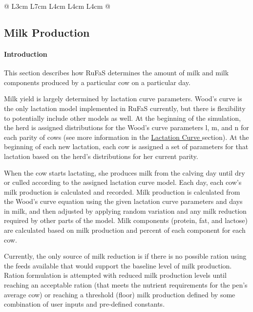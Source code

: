 \documentclass{article}
\begin{document}
\begin{refsection}
\begin{landscape}
\begin{longtable}{@{} L{3cm}  L{7cm} L{4cm} L{4cm} L{4cm}  @{}}
\end{longtable}

\vspace{0.5cm}
\end{landscape}


\subsection{Milk Production} \label{milkprod}
 
    \paragraph{Introduction} This section describes how RuFaS determines the amount of milk and milk components produced by a particular cow on a particular day. 
    \vspace{0.25cm}
    
    Milk yield is largely determined by lactation curve parameters. Wood’s curve is the only lactation model implemented in RuFaS currently, but there is flexibility to potentially include other models as well. At the beginning of the simulation, the herd is assigned distributions for the Wood’s curve parameters l, m, and n for each parity of cows (see more information in the \hyperref[lactcurve]{Lactation Curve } section). At the beginning of each new lactation, each cow is assigned a set of parameters for that lactation based on the herd’s distributions for her current parity. 
    \vspace{0.25cm}
    
    When the cow starts lactating, she produces milk from the calving day until dry or culled according to the assigned lactation curve model. Each day, each cow’s milk production is calculated and recorded. Milk production is calculated from the Wood’s curve equation using the given lactation curve parameters and days in milk, and then adjusted by applying random variation and any milk reduction required by other parts of the model. Milk components (protein, fat, and lactose) are calculated based on milk production and percent of each component for each cow. 
    \vspace{0.25cm}
    
    Currently, the only source of milk reduction is if there is no possible ration using the feeds available that would support the baseline level of milk production. Ration formulation is attempted with reduced milk production levels until reaching an acceptable ration (that meets the nutrient requirements for the pen’s average cow) or reaching a threshold (floor) milk production defined by some combination of user inputs and pre-defined constants. 
    




\end{refsection}
\end{document}
